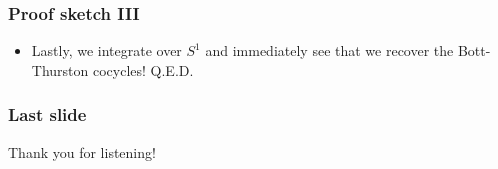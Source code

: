 \documentclass{beamer}
\begin{document}
\begin{frame}
    \frametitle{Proof sketch III}
    \begin{itemize}
        \item <1 -> Lastly, we integrate over $S^1$ and immediately see that 
        we recover the Bott-Thurston cocycles! Q.E.D.
    \end{itemize}
\end{frame}

\begin{frame}
    \frametitle{Last slide}
    \huge Thank you for listening!
\end{frame}


\end{document}
